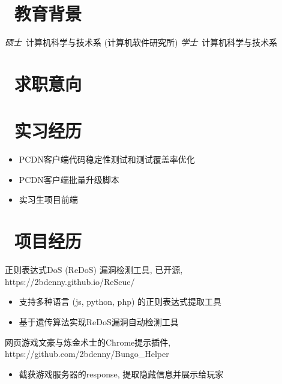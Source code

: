 \documentclass{resume}
\begin{document}

\section{\faGraduationCap\  教育背景}
\textit{硕士}\ 计算机科学与技术系 (计算机软件研究所)
\textit{学士}\ 计算机科学与技术系

\section{\faStar\ 求职意向}

\section{\faUsers\ 实习经历}
\begin{itemize}
  \item PCDN客户端代码稳定性测试和测试覆盖率优化
  \item PCDN客户端批量升级脚本
  \item 实习生项目前端
\end{itemize}

\section{\faSearch\ 项目经历}
正则表达式DoS (ReDoS) 漏洞检测工具, 已开源, https://2bdenny.github.io/ReScue/
\begin{itemize}
  \item 支持多种语言 (js, python, php) 的正则表达式提取工具
  \item 基于遗传算法实现ReDoS漏洞自动检测工具
\end{itemize}

网页游戏文豪与炼金术士的Chrome提示插件, https://github.com/2bdenny/Bungo\_Helper
\begin{itemize}
  \item 截获游戏服务器的response, 提取隐藏信息并展示给玩家
\end{itemize}
\end{document}
